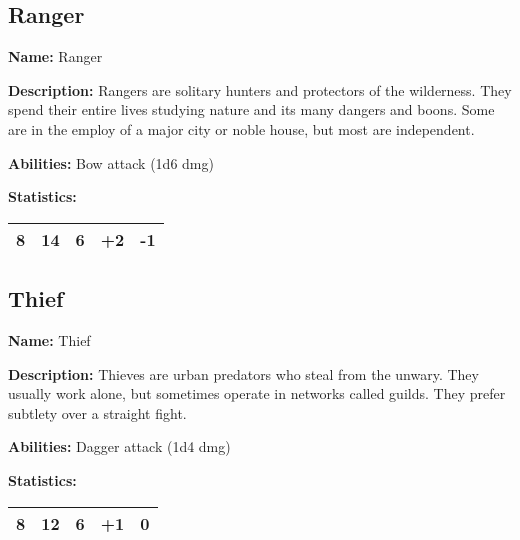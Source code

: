 \begin{multicols}{2}
\subsection{Ranger}

\textbf{Name:} Ranger

\textbf{Description:} Rangers are solitary hunters and protectors of the wilderness. They
spend their entire lives studying nature and its many dangers and boons. Some are in the
employ of a major city or noble house, but most are independent.

\textbf{Abilities:} Bow attack (1d6 dmg)

\textbf{Statistics:}

\begin{center}
{
\begin{xtabular}{|l|l|l|l|l|}
8 & 14 & 6 & +2 & -1 \\
\hline
\end{xtabular}
}
\end{center}

\subsection{Thief}

\textbf{Name:} Thief

\textbf{Description:} Thieves are urban predators who steal from the unwary. They
usually work alone, but sometimes operate in networks called guilds. They prefer
subtlety over a straight fight.

\textbf{Abilities:} Dagger attack (1d4 dmg)

\textbf{Statistics:}

\begin{center}
{
\begin{xtabular}{|l|l|l|l|l|}
8 & 12 & 6 & +1 & 0 \\
\hline
\end{xtabular}
}
\end{center}


\end{multicols}
